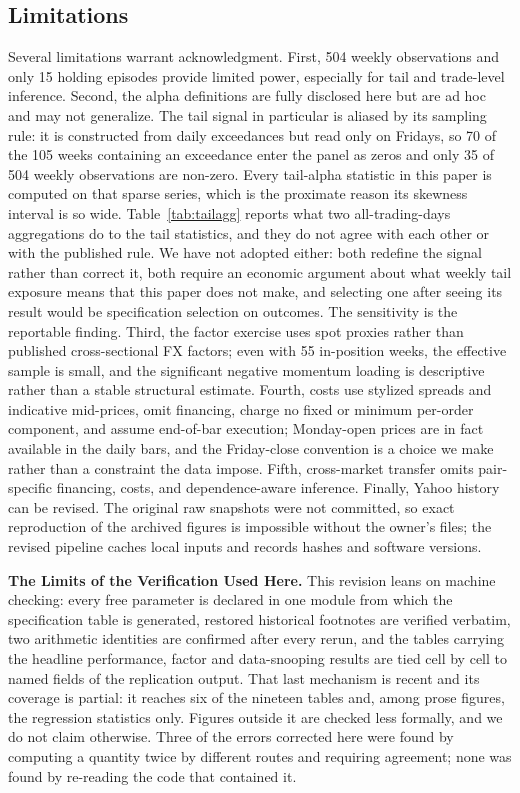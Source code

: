 \documentclass[11pt]{article}
\begin{document}
\subsection{Limitations}
\label{sec:limitations}

Several limitations warrant acknowledgment. First, 504 weekly observations and only 15 holding episodes provide limited power, especially for tail and trade-level inference. Second, the alpha definitions are fully disclosed here but are ad hoc and may not generalize. The tail signal in particular is aliased by its sampling rule: it is constructed from daily exceedances but read only on Fridays, so 70 of the 105 weeks containing an exceedance enter the panel as zeros and only 35 of 504 weekly observations are non-zero. Every tail-alpha statistic in this paper is computed on that sparse series, which is the proximate reason its skewness interval is so wide. Table~\ref{tab:tailagg} reports what two all-trading-days aggregations do to the tail statistics, and they do not agree with each other or with the published rule. We have not adopted either: both redefine the signal rather than correct it, both require an economic argument about what weekly tail exposure means that this paper does not make, and selecting one after seeing its result would be specification selection on outcomes. The sensitivity is the reportable finding. Third, the factor exercise uses spot proxies rather than published cross-sectional FX factors; even with 55 in-position weeks, the effective sample is small, and the significant negative momentum loading is descriptive rather than a stable structural estimate. Fourth, costs use stylized spreads and indicative mid-prices, omit financing, charge no fixed or minimum per-order component, and assume end-of-bar execution; Monday-open prices are in fact available in the daily bars, and the Friday-close convention is a choice we make rather than a constraint the data impose. Fifth, cross-market transfer omits pair-specific financing, costs, and dependence-aware inference. Finally, Yahoo history can be revised. The original raw snapshots were not committed, so exact reproduction of the archived figures is impossible without the owner's files; the revised pipeline caches local inputs and records hashes and software versions.

\textbf{The Limits of the Verification Used Here.} This revision leans on machine checking: every free parameter is declared in one module from which the specification table is generated, restored historical footnotes are verified verbatim, two arithmetic identities are confirmed after every rerun, and the tables carrying the headline performance, factor and data-snooping results are tied cell by cell to named fields of the replication output. That last mechanism is recent and its coverage is partial: it reaches six of the nineteen tables and, among prose figures, the regression statistics only. Figures outside it are checked less formally, and we do not claim otherwise. Three of the errors corrected here were found by computing a quantity twice by different routes and requiring agreement; none was found by re-reading the code that contained it.
\end{document}
